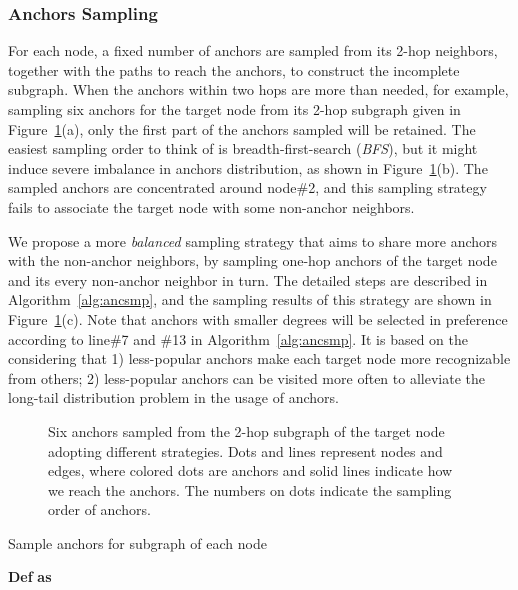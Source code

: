 \documentclass{article}
\begin{document}
\subsubsection{Anchors Sampling}
\label{sec:anc_smp}
For each node, a fixed number of anchors are sampled from its 2-hop neighbors, together with the paths to reach the anchors, to construct the incomplete subgraph. When the anchors within two hops are more than needed, for example, sampling six anchors for the target node from its 2-hop subgraph given in Figure~\ref{fig:ancsmp}(a), only the first part of the anchors sampled will be retained. The easiest sampling order to think of is breadth-first-search (\emph{BFS}), but it might induce severe imbalance in anchors distribution, as shown in Figure~\ref{fig:ancsmp}(b).
The sampled anchors are concentrated around node\#2, and this sampling strategy fails to associate the target node with some non-anchor neighbors.

We propose a more \emph{balanced} sampling strategy that aims to share more anchors with the non-anchor neighbors, by sampling one-hop anchors of the target node and its every non-anchor neighbor in turn. The detailed steps are described in Algorithm~\ref{alg:ancsmp}, and the sampling results of this strategy are shown in Figure~\ref{fig:ancsmp}(c). Note that anchors with smaller degrees will be selected in preference according to line\#7 and \#13 in Algorithm~\ref{alg:ancsmp}. It is based on the considering that 1) 
less-popular anchors make each target node more recognizable from others; 2) less-popular anchors can be visited more often to alleviate the long-tail distribution problem in the usage of anchors.

\begin{figure}
 \centering
 \caption{Six anchors sampled from the 2-hop subgraph of the target node  adopting different strategies. Dots and lines represent nodes and edges, where colored dots are anchors and solid lines indicate how we reach the anchors. The numbers on dots indicate the sampling order of anchors.}
 \label{fig:ancsmp}
\end{figure}

\begin{algorithm}
\caption{Sample anchors for subgraph of each node}
\label{alg:ancsmp}
\DontPrintSemicolon
\SetAlgoLined
{}
\textbf{Def }\textbf{ as }\;
\;
\;
\While{}{
  \;
  \If{}{
    \;
    \;
  }
  \For{}{
    \;
    \If{}{
      \;
      \;
    }
  }
}
\end{algorithm}
\end{document}
